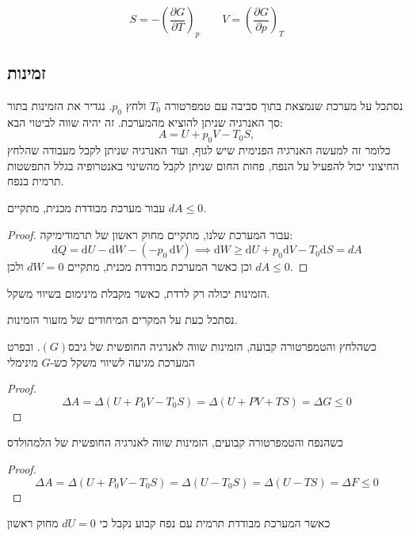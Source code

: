 \documentclass{tstextbook}
\begin{document}
\begin{corollary}
$$S=-\left(\frac{\partial G}{\partial T}\right)_{p}\qquad V=\left(\frac{\partial G}{\partial p}\right)_{T}$$

\end{corollary}
\subsection{זמינות}

\begin{definition}[זמינות]
נסתכל על מערכת שנמצאת בתוך סביבה עם טמפרטורה \(T_{0}\) ולחץ \(p_{0}\). נגדיר את הזמינות בתור סך האנרגיה שניתן להוציא מהמערכת. זה יהיה שווה לביטוי הבא:
$$
A=U+p_{0}V-T_{0}S,$$
כלומר זה למעשה האנרגיה הפנימית שיש לגוף, ועוד האנרגיה שניתן לקבל מעבודה שהלחץ החיצוני יכול להפעיל על הנפח, פחות החום שניתן לקבל מהשינוי באנטרופיה בגלל התפשטות תרמית בנפח.

\end{definition}
\begin{proposition}
עבור מערכת מבודדת מכנית, מתקיים \(dA\leq 0\). 

\end{proposition}
\begin{proof}
עבור המערכת שלנו, מתקיים מחוק ראשון של תרמודימיקה:
$${\mathrm{d}}Q=\mathrm{d}U-{\mathrm{d}}W-\left( -p_{0}\,\mathrm{d}V \right)\implies \mathrm{d}W\geq\mathrm{d}U+p_{0}\mathrm{d}V-T_{0}\mathrm{d}S=dA$$
וכן כאשר המערכת מבודדת מכנית, מתקיים \(dW=0\) ולכן \(dA\leq 0\).

\end{proof}
\begin{corollary}
הזמינות יכולה רק לרדת, כאשר מקבלת מינימום בשיווי משקל.

\end{corollary}
נסתכל כעת על המקרים המיחודים של מזעור הזמינות.

\begin{proposition}
כשהלחץ והטמפרטורה קבועה, הזמינות שווה לאנרגיה החופשית של גיבס\((G)\). ובפרט המערכת מגיעה לשיווי משקל כש-\(G\) מינימלי

\end{proposition}
\begin{proof}
$$\Delta\!A\!=\!\Delta(U\!+\!P_{0}V\!-\!T_{0}S)\!=\!\Delta(U\!+\!P V\!+\!T S)\!=\!\Delta G\!\leq\!0$$

\end{proof}
\begin{proposition}
כשהנפח והטמפרטורה קבועים, הזמינות שווה לאנרגיה החופשית של הלמהולדס

\end{proposition}
\begin{proof}
$$\Delta A=\Delta(U+P_{0}V-T_{0}S)=\Delta(U-T_{0}S)=\Delta(U-T S)=\Delta F\leq0$$

\end{proof}
\begin{corollary}
כאשר המערכת מבודדת תרמית עם נפח קבוע נקבל כי \(dU=0\) מחוק ראשון

\end{corollary}
\end{document}
